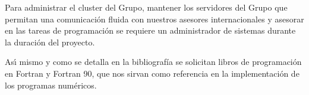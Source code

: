 Para administrar el cluster del Grupo, mantener los servidores del
Grupo que permitan una comunicación fluida con nuestros asesores
internacionales y asesorar en las tareas de programación se requiere
un administrador de sistemas durante la duración del proyecto.

As\'\i{} mismo y como se detalla en la bibliografía se solicitan libros de
programación en Fortran y Fortran 90, que nos sirvan como referencia
en la implementación de los programas numéricos.



